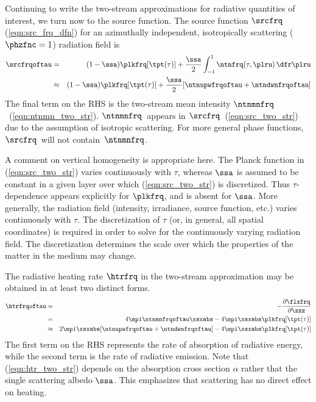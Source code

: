 \documentclass[12pt]{article}
\begin{document}
Continuing to write the two-stream approximations for radiative
quantities of interest, we turn now to the source function.
The source function $\srcfrq$ (\ref{eqn:src_frq_dfn}) for an azimuthally
independent, isotropically scattering ($\phzfnc = 1$) radiation field is  
\begin{eqnarray}
\srcfrqoftau
& = & 
(1-\ssa)\plkfrq[\tpt(\tau)] + \frac{\ssa}{2} 
\int_{-1}^{1} \ntnfrq(\tau,\plru) \,\dfr\plru \nonumber \\
& \approx & 
(1-\ssa)\plkfrq[\tpt(\tau)] + \frac{\ssa}{2}
[\ntnupwfrqoftau + \ntndwnfrqoftau]
\label{eqn:src_two_str}
\end{eqnarray}
The final term on the RHS is the two-stream mean intensity
$\ntnmnfrq$~(\ref{eqn:ntnmn_two_str}). 
$\ntnmnfrq$~appears in $\srcfrq$~(\ref{eqn:src_two_str}) due to the 
assumption of isotropic scattering. 
For more general phase functions, $\srcfrq$~will not
contain~$\ntnmnfrq$.  

A comment on vertical homogeneity is appropriate here.
The Planck function in (\ref{eqn:src_two_str}) varies
continuously with $\tau$, whereas $\ssa$ is assumed to be constant in
a given layer over which (\ref{eqn:src_two_str}) is discretized.
Thus $\tau$-dependence appears explicitly for $\plkfrq$, and is absent
for $\ssa$.
More generally, the radiation field (intensity, irradiance, source
function, etc.) varies continuously with $\tau$.
The discretization of $\tau$ (or, in general, all spatial coordinates) 
is required in order to solve for the continuously varying radiation
field. 
The discretization determines the scale over which the properties of
the matter in the medium may change.

The radiative heating rate $\htrfrq$ in the two-stream approximation
may be obtained in at least two distinct forms.
\begin{eqnarray}
\htrfrqoftau
& = & 
-\frac{\partial \flxfrq}{\partial \zzz} \nonumber \\
& = & 
4\mpi \ntnmnfrqoftau \xsxabs - 4\mpi \xsxabs \plkfrq[\tpt(\tau)] \nonumber \\
& \approx & 
2 \mpi \xsxabs [ \ntnupwfrqoftau + \ntndwnfrqoftau ] 
- 4\mpi \xsxabs \plkfrq[\tpt(\tau)]
\label{eqn:htr_two_str}
\end{eqnarray}
The first term on the RHS represents the rate of absorption of
radiative energy, while the second term is the rate of radiative
emission. 
Note that (\ref{eqn:htr_two_str}) depends on the absorption cross
section $\alpha$ rather that the single scattering albedo $\ssa$.
This emphasizes that scattering has no direct effect on heating.
\end{document}
